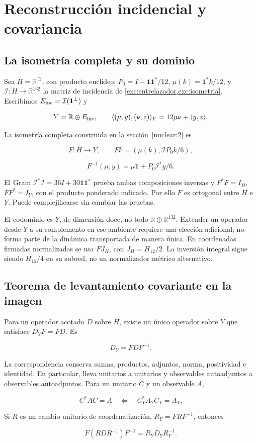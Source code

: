 \section{Reconstrucción incidencial y covariancia}
\label{nuclear:5}
\subsection{La isometría completa y su dominio}\label{nuc05:isometria}

Sea \(H=\mathbb R^{12}\), con producto euclídeo; \(P_0=I-\mathbf1\mathbf1^*/12\), \(\mu(k)=\mathbf1^*k/12\), y \(\mathcal I:H\to\mathbb R^{132}\) la matriz de incidencia de \cref{exc:entrelazador,exc:isometria}. Escribimos \(E_{\rm inc}=\mathcal I(\mathbf1^\perp)\) y

\[
Y=\mathbb R\oplus E_{\rm inc},\qquad
\langle(\mu,y),(\nu,z)\rangle_Y=12\mu\nu+\langle y,z\rangle.
\]

La isometría completa construida en la sección~\ref{nuclear:2} es

\[
F:H\longrightarrow Y,\qquad Fk=(\mu(k),\mathcal I P_0k/6),
\]

\[
F^{-1}(\mu,y)=\mu\mathbf1+P_0\mathcal I^*y/6.
\]

El Gram \(\mathcal I^*\mathcal I=36I+30\mathbf1\mathbf1^*\) prueba ambas composiciones inversas y \(F^*F=I_H\), \(FF^*=I_Y\), con el producto ponderado indicado. Por ello \(F\) es ortogonal entre \(H\) e \(Y\). Puede complejificarse sin cambiar las pruebas.

El codominio es \(Y\), de dimensión doce, no todo \(\mathbb R\oplus\mathbb R^{132}\). Extender un operador desde \(Y\) a su complemento en ese ambiente requiere una elección adicional; no forma parte de la dinámica transportada de manera única. En coordenadas firmadas normalizadas se usa \(FJ_H\), con \(J_H=H_{12}/2\). La inversión integral sigue siendo \(H_{12}/4\) en su subred, no un normalizador métrico alternativo.

\subsection{Teorema de levantamiento covariante en la imagen}\label{nuc05:levantamiento}

\begin{theorem}
Para un operador acotado \(D\) sobre \(H\), existe un único operador sobre \(Y\) que satisface \(D_YF=FD\). Es

\[
D_Y=FDF^{-1}.
\]

La correspondencia conserva sumas, productos, adjuntos, norma, positividad e identidad. En particular, lleva unitarios a unitarios y observables autoadjuntos a observables autoadjuntos. Para un unitario \(C\) y un observable \(A\),

\[
C^*AC=A\quad\Longleftrightarrow\quad C_Y^*A_YC_Y=A_Y.
\]

Si \(R\) es un cambio unitario de coordenatización, \(R_Y=FRF^{-1}\), entonces

\[
F(RDR^{-1})F^{-1}=R_YD_YR_Y^{-1}.
\]
\end{theorem}

